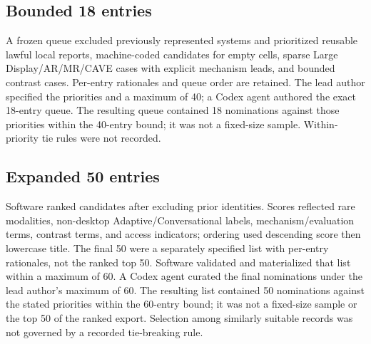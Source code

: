 \documentclass[11pt]{article}
\begin{document}
\subsection{Bounded 18 entries}
A frozen queue excluded previously represented systems and prioritized reusable lawful local reports, machine-coded candidates for empty cells, sparse Large Display/AR/MR/CAVE cases with explicit mechanism leads, and bounded contrast cases. Per-entry rationales and queue order are retained. The lead author specified the priorities and a maximum of 40; a Codex agent authored the exact 18-entry queue. The resulting queue contained 18 nominations against those priorities within the 40-entry bound; it was not a fixed-size sample. Within-priority tie rules were not recorded.

\subsection{Expanded 50 entries}
Software ranked candidates after excluding prior identities. Scores reflected rare modalities, non-desktop Adaptive/Conversational labels, mechanism/evaluation terms, contrast terms, and access indicators; ordering used descending score then lowercase title. The final 50 were a separately specified list with per-entry rationales, not the ranked top 50. Software validated and materialized that list within a maximum of 60. A Codex agent curated the final nominations under the lead author's maximum of 60. The resulting list contained 50 nominations against the stated priorities within the 60-entry bound; it was not a fixed-size sample or the top 50 of the ranked export. Selection among similarly suitable records was not governed by a recorded tie-breaking rule.
\end{document}
